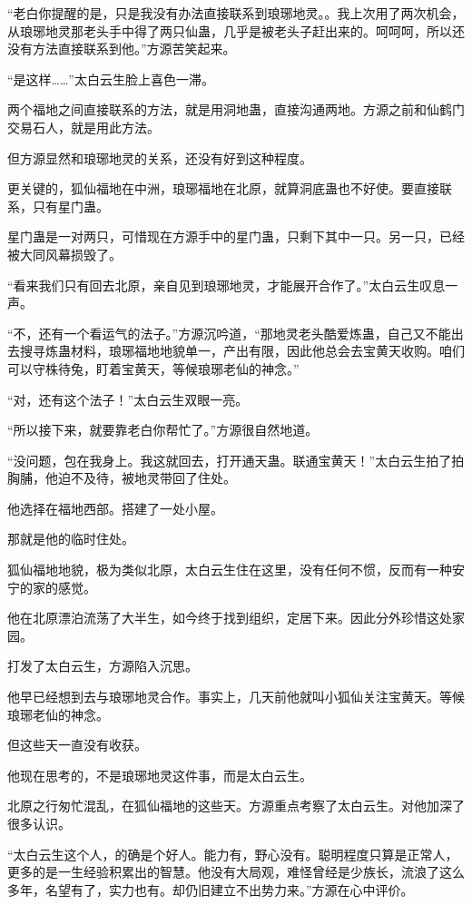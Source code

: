 
\begin{this_body}

“老白你提醒的是，只是我没有办法直接联系到琅琊地灵。。我上次用了两次机会，从琅琊地灵那老头手中得了两只仙蛊，几乎是被老头子赶出来的。呵呵呵，所以还没有方法直接联系到他。”方源苦笑起来。

“是这样……”太白云生脸上喜色一滞。

两个福地之间直接联系的方法，就是用洞地蛊，直接沟通两地。方源之前和仙鹤门交易石人，就是用此方法。

但方源显然和琅琊地灵的关系，还没有好到这种程度。

更关键的，狐仙福地在中洲，琅琊福地在北原，就算洞底蛊也不好使。要直接联系，只有星门蛊。

星门蛊是一对两只，可惜现在方源手中的星门蛊，只剩下其中一只。另一只，已经被大同风幕损毁了。

“看来我们只有回去北原，亲自见到琅琊地灵，才能展开合作了。”太白云生叹息一声。

“不，还有一个看运气的法子。”方源沉吟道，“那地灵老头酷爱炼蛊，自己又不能出去搜寻炼蛊材料，琅琊福地地貌单一，产出有限，因此他总会去宝黄天收购。咱们可以守株待兔，盯着宝黄天，等候琅琊老仙的神念。”

“对，还有这个法子！”太白云生双眼一亮。

“所以接下来，就要靠老白你帮忙了。”方源很自然地道。

“没问题，包在我身上。我这就回去，打开通天蛊。联通宝黄天！”太白云生拍了拍胸脯，他迫不及待，被地灵带回了住处。

他选择在福地西部。搭建了一处小屋。

那就是他的临时住处。

狐仙福地地貌，极为类似北原，太白云生住在这里，没有任何不惯，反而有一种安宁的家的感觉。

他在北原漂泊流荡了大半生，如今终于找到组织，定居下来。因此分外珍惜这处家园。

打发了太白云生，方源陷入沉思。

他早已经想到去与琅琊地灵合作。事实上，几天前他就叫小狐仙关注宝黄天。等候琅琊老仙的神念。

但这些天一直没有收获。

他现在思考的，不是琅琊地灵这件事，而是太白云生。

北原之行匆忙混乱，在狐仙福地的这些天。方源重点考察了太白云生。对他加深了很多认识。

“太白云生这个人，的确是个好人。能力有，野心没有。聪明程度只算是正常人，更多的是一生经验积累出的智慧。他没有大局观，难怪曾经是少族长，流浪了这么多年，名望有了，实力也有。却仍旧建立不出势力来。”方源在心中评价。


\end{this_body}
